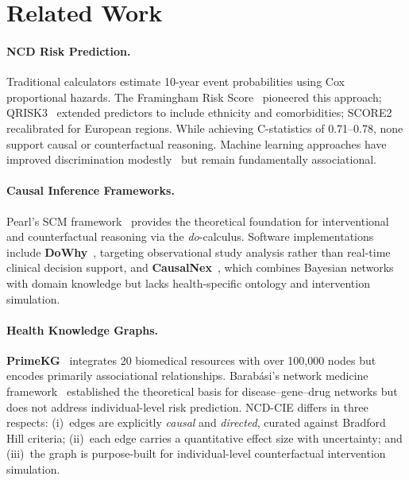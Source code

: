 \documentclass[runningheads]{llncs}
\begin{document}
\section{Related Work}\label{sec:related}

\paragraph{NCD Risk Prediction.}
Traditional calculators estimate 10-year event probabilities using Cox
proportional hazards.  The Framingham Risk
Score~\cite{dagostino2008framingham} pioneered this approach;
QRISK3~\cite{hippisley2017qrisk3} extended predictors to include
ethnicity and comorbidities; SCORE2~\cite{score22021} recalibrated
for European regions.  While achieving C-statistics of 0.71--0.78,
none support causal or counterfactual reasoning.  Machine learning
approaches have improved discrimination
modestly~\cite{alaa2019attentive} but remain fundamentally
associational.

\paragraph{Causal Inference Frameworks.}
Pearl's SCM framework~\cite{pearl2009causality} provides the
theoretical foundation for interventional and counterfactual reasoning
via the \emph{do}-calculus.  Software implementations include
\textbf{DoWhy}~\cite{sharma2020dowhy}, targeting observational study
analysis rather than real-time clinical decision support, and
\textbf{CausalNex}~\cite{beaumont2021causalnex}, which combines
Bayesian networks with domain knowledge but lacks health-specific
ontology and intervention simulation.

\paragraph{Health Knowledge Graphs.}
\textbf{PrimeKG}~\cite{chandak2023primekg} integrates 20 biomedical
resources with over 100{,}000 nodes but encodes primarily
associational relationships.  Barab\'{a}si's network medicine
framework~\cite{barabasi2011network} established the theoretical
basis for disease--gene--drug networks but does not address
individual-level risk prediction.  NCD-CIE differs in three respects:
(i)~edges are explicitly \emph{causal} and \emph{directed}, curated
against Bradford Hill criteria; (ii)~each edge carries a quantitative
effect size with uncertainty; and (iii)~the graph is purpose-built for
individual-level counterfactual intervention simulation.
\end{document}
